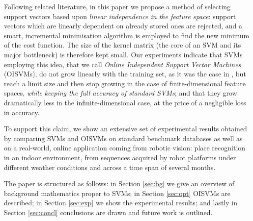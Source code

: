 Following related literature, in this paper we propose a method of
selecting support vectors based upon \emph{linear independence in the
feature space}: support vectors which are linearly dependent on
already stored ones are rejected, and a smart, incremental
minimisation algorithm is employed to find the new minimum of the cost
function. The size of the kernel matrix (the core of an
SVM and its major bottleneck) is therefore kept small. Our
experiments indicate that SVMs employing this idea, that we call
\emph{Online Independent Support Vector Machines} (OISVMs), do
not grow linearly with the training set, as it was the case in
\cite{Steinwart03}, but reach a limit size and then stop growing in
the case of finite-dimensional feature spaces, \emph{while keeping the
full accuracy of standard SVMs}; and that they grow dramatically less
in the infinite-dimensional case, at the price of a negligible loss in
accuracy.

To support this claim, we show an extensive set of experimental
results obtained by comparing SVMs and OISVMs on standard benchmark
databases as well as on a real-world, online application coming from
robotic vision: place recognition in an indoor environment, from
sequences acquired by robot platforms under different weather
conditions and across a time span of several months.

The paper is structured as follows: in Section \ref{sec:bg} we give an
overview of background mathematics proper to SVMs; in Section
\ref{sec:opt} OISVMs are described; in Section
\ref{sec:exp} we show the experimental results; and lastly in Section
\ref{sec:concl} conclusions are drawn and future work is outlined.
